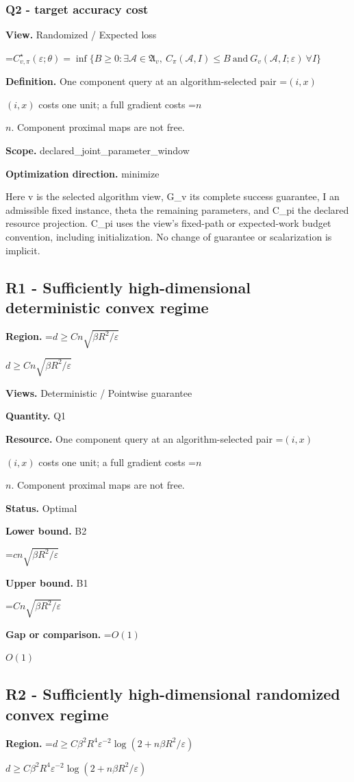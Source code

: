 \documentclass[10pt,a4paper]{article}
\newcommand{\AtlasMath}[1]{\par\begingroup\centering\setbox0=\hbox{$\displaystyle #1$}\ifdim\wd0>1.4\linewidth\typeout{ATLAS WIDE FORMULA: \the\wd0}\fi\ifdim\wd0>\linewidth\resizebox{\linewidth}{!}{\box0}\else\box0\fi\par\endgroup}
\newcommand{\AtlasInlineMath}[1]{\begingroup\setbox0=\hbox{$#1$}\ifdim\wd0>.4\linewidth\endgroup\AtlasMath{#1}\else\endgroup$#1$\fi}
\begin{document}
\subsubsection{Q2 - target accuracy cost}
\textbf{View.} Randomized / Expected loss

\AtlasMath{C^\star_{v,\pi}(\varepsilon;\theta)=\inf\{B\ge0:\exists\mathcal A\in\mathfrak A_v,\ C_\pi(\mathcal A,I)\le B\ \text{and}\ G_v(\mathcal A,I;\varepsilon)\ \forall I\}}
\textbf{Definition.} One component query at an algorithm-selected pair \AtlasInlineMath{(i,x)} costs one unit; a full gradient costs \AtlasInlineMath{n}. Component proximal maps are not free.

\textbf{Scope.} declared\_joint\_parameter\_window

\textbf{Optimization direction.} minimize

Here v is the selected algorithm view, G\_v its complete success guarantee, I an admissible fixed instance, theta the remaining parameters, and C\_pi the declared resource projection. C\_pi uses the view's fixed-path or expected-work budget convention, including initialization. No change of guarantee or scalarization is implicit.

\subsection{R1 - Sufficiently high-dimensional deterministic convex regime}
\textbf{Region.} \AtlasInlineMath{d\ge Cn\sqrt{\beta R^2/\varepsilon}}

\textbf{Views.} Deterministic / Pointwise guarantee

\textbf{Quantity.} Q1

\textbf{Resource.} One component query at an algorithm-selected pair \AtlasInlineMath{(i,x)} costs one unit; a full gradient costs \AtlasInlineMath{n}. Component proximal maps are not free.

\textbf{Status.} Optimal

\textbf{Lower bound.} B2

\AtlasMath{cn\sqrt{\beta R^2/\varepsilon}}
\textbf{Upper bound.} B1

\AtlasMath{Cn\sqrt{\beta R^2/\varepsilon}}
\textbf{Gap or comparison.} \AtlasInlineMath{O(1)}

\subsection{R2 - Sufficiently high-dimensional randomized convex regime}
\textbf{Region.} \AtlasInlineMath{d\ge C\beta^2R^4\varepsilon^{-2}\log(2+n\beta R^2/\varepsilon)}
\end{document}
